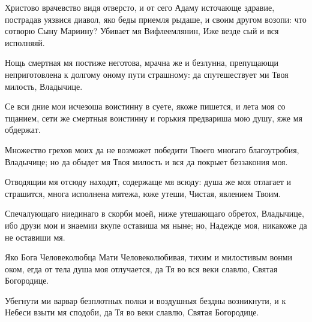 \begin{mymulticols}
Христово врачевство видя отверсто, и от сего Адаму источающе здравие, пострадав уязвися диавол, яко беды приемля рыдаше, и своим другом возопи: что сотворю Сыну Мариину? Убивает мя Вифлеемлянин, Иже везде сый и вся исполняяй.




Нощь смертная мя постиже неготова, мрачна же и безлунна, препущающи неприготовлена к долгому оному пути страшному: да спутешествует ми Твоя милость, Владычице. 


Се вси дние мои исчезоша воистинну в суете, якоже пишется, и лета моя со тщанием, сети же смертныя воистинну и горькия предвариша мою душу, яже мя обдержат. 


Множество грехов моих да не возможет победити Твоего многаго благоутробия, Владычице; но да обыдет мя Твоя милость и вся да покрыет беззакония моя. 

\slavan

Отводящии мя отсюду находят, содержаще мя всюду: душа же моя отлагает и страшится, многа исполнена мятежа, юже утеши, Чистая, явлением Твоим. 

\inynen

 Спечалующаго ниединаго в скорби моей, ниже утешающаго обретох, Владычице, ибо друзи мои и знаемии вкупе оставиша мя ныне; но, Надежде моя, никакоже да не оставиши мя.




Яко Бога Человеколюбца Мати Человеколюбивая, тихим и милостивым вонми оком, егда от тела душа моя отлучается, да Тя во вся веки славлю, Святая Богородице. 


Убегнути ми варвар безплотных полки и воздушныя бездны возникнути, и к Небеси взыти мя сподоби, да Тя во веки славлю, Святая Богородице. 


\end{mymulticols}
